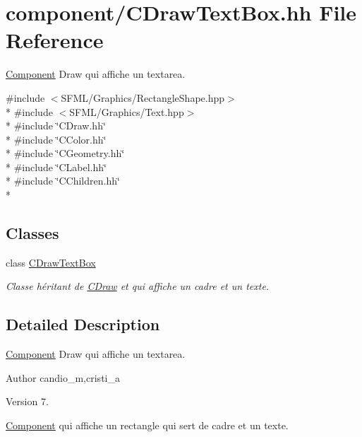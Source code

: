 \hypertarget{_c_draw_text_box_8hh}{}\section{component/\+C\+Draw\+Text\+Box.hh File Reference}
\label{_c_draw_text_box_8hh}


\hyperlink{class_component}{Component} Draw qui affiche un textarea.  


{\ttfamily \#include $<$S\+F\+M\+L/\+Graphics/\+Rectangle\+Shape.\+hpp$>$}\\*
{\ttfamily \#include $<$S\+F\+M\+L/\+Graphics/\+Text.\+hpp$>$}\\*
{\ttfamily \#include \char`\"{}C\+Draw.\+hh\char`\"{}}\\*
{\ttfamily \#include \char`\"{}C\+Color.\+hh\char`\"{}}\\*
{\ttfamily \#include \char`\"{}C\+Geometry.\+hh\char`\"{}}\\*
{\ttfamily \#include \char`\"{}C\+Label.\+hh\char`\"{}}\\*
{\ttfamily \#include \char`\"{}C\+Children.\+hh\char`\"{}}\\*
\subsection*{Classes}
\begin{DoxyCompactItemize}
\item 
class \hyperlink{class_c_draw_text_box}{C\+Draw\+Text\+Box}
\begin{DoxyCompactList}\small\item\em Classe héritant de \hyperlink{class_c_draw}{C\+Draw} et qui affiche un cadre et un texte. \end{DoxyCompactList}\end{DoxyCompactItemize}


\subsection{Detailed Description}
\hyperlink{class_component}{Component} Draw qui affiche un textarea. 

\begin{DoxyAuthor}{Author}
candio\+\_\+m,cristi\+\_\+a 
\end{DoxyAuthor}
\begin{DoxyVersion}{Version}
7.
\end{DoxyVersion}
\hyperlink{class_component}{Component} qui affiche un rectangle qui sert de cadre et un texte. 
